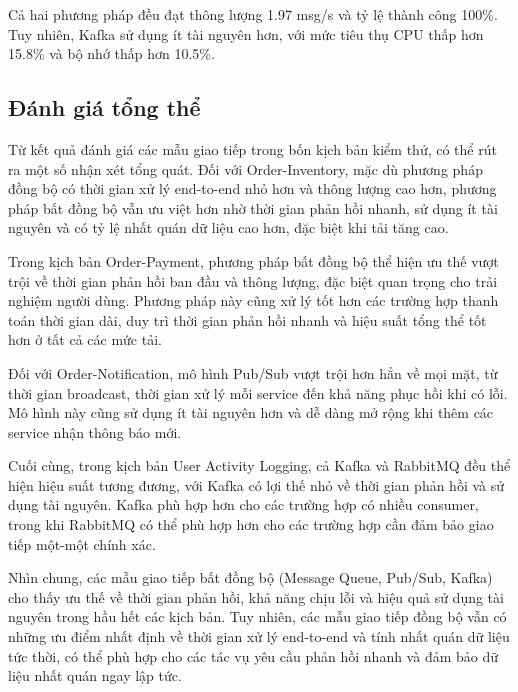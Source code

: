 Cả hai phương pháp đều đạt thông lượng 1.97 msg/s và tỷ lệ thành công 100\%. Tuy nhiên, Kafka sử dụng ít tài nguyên hơn, với mức tiêu thụ CPU thấp hơn 15.8\% và bộ nhớ thấp hơn 10.5\%.

\subsection{Đánh giá tổng thể}
Từ kết quả đánh giá các mẫu giao tiếp trong bốn kịch bản kiểm thử, có thể rút ra một số nhận xét tổng quát. Đối với Order-Inventory, mặc dù phương pháp đồng bộ có thời gian xử lý end-to-end nhỏ hơn và thông lượng cao hơn, phương pháp bất đồng bộ vẫn ưu việt hơn nhờ thời gian phản hồi nhanh, sử dụng ít tài nguyên và có tỷ lệ nhất quán dữ liệu cao hơn, đặc biệt khi tải tăng cao.

Trong kịch bản Order-Payment, phương pháp bất đồng bộ thể hiện ưu thế vượt trội về thời gian phản hồi ban đầu và thông lượng, đặc biệt quan trọng cho trải nghiệm người dùng. Phương pháp này cũng xử lý tốt hơn các trường hợp thanh toán thời gian dài, duy trì thời gian phản hồi nhanh và hiệu suất tổng thể tốt hơn ở tất cả các mức tải.

Đối với Order-Notification, mô hình Pub/Sub vượt trội hơn hẳn về mọi mặt, từ thời gian broadcast, thời gian xử lý mỗi service đến khả năng phục hồi khi có lỗi. Mô hình này cũng sử dụng ít tài nguyên hơn và dễ dàng mở rộng khi thêm các service nhận thông báo mới.

Cuối cùng, trong kịch bản User Activity Logging, cả Kafka và RabbitMQ đều thể hiện hiệu suất tương đương, với Kafka có lợi thế nhỏ về thời gian phản hồi và sử dụng tài nguyên. Kafka phù hợp hơn cho các trường hợp có nhiều consumer, trong khi RabbitMQ có thể phù hợp hơn cho các trường hợp cần đảm bảo giao tiếp một-một chính xác.

Nhìn chung, các mẫu giao tiếp bất đồng bộ (Message Queue, Pub/Sub, Kafka) cho thấy ưu thế về thời gian phản hồi, khả năng chịu lỗi và hiệu quả sử dụng tài nguyên trong hầu hết các kịch bản. Tuy nhiên, các mẫu giao tiếp đồng bộ vẫn có những ưu điểm nhất định về thời gian xử lý end-to-end và tính nhất quán dữ liệu tức thời, có thể phù hợp cho các tác vụ yêu cầu phản hồi nhanh và đảm bảo dữ liệu nhất quán ngay lập tức.